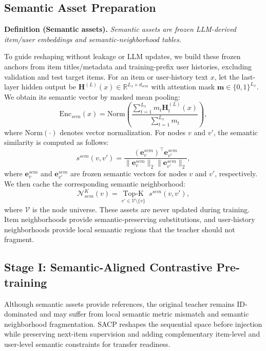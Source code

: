 ﻿\documentclass{article}
\begin{document}
\subsection{Semantic Asset Preparation}

\noindent\textbf{Definition (Semantic assets).} \textit{Semantic assets are frozen LLM-derived item/user embeddings and semantic-neighborhood tables.}

To guide reshaping without leakage or LLM updates, we build these frozen anchors from item titles/metadata and training-prefix user histories, excluding validation and test target items. For an item or user-history text $x$, let the last-layer hidden output be $\mathbf{H}^{(L)}(x)\in\mathbb{R}^{L_x\times d_{sem}}$ with attention mask $\mathbf{m}\in\{0,1\}^{L_x}$. We obtain its semantic vector by masked mean pooling:
\begin{equation}
\mathrm{Enc}_{sem}(x)=
\mathrm{Norm}\!\left(
\frac{\sum_{t=1}^{L_x} m_t \mathbf{H}^{(L)}_t(x)}
{\sum_{t=1}^{L_x} m_t}
\right),
\end{equation}
where $\mathrm{Norm}(\cdot)$ denotes vector normalization. For nodes $v$ and $v'$, the semantic similarity is computed as follows:
\begin{equation}
s^{sem}(v,v')
=
\frac{(\mathbf{e}_v^{sem})^\top \mathbf{e}_{v'}^{sem}}
{\|\mathbf{e}_v^{sem}\|_2\|\mathbf{e}_{v'}^{sem}\|_2},
\end{equation}
where $\mathbf{e}_v^{sem}$ and $\mathbf{e}_{v'}^{sem}$ are frozen semantic vectors for nodes $v$ and $v'$, respectively. We then cache the corresponding semantic neighborhood:
\begin{equation}
\mathcal{N}_{sem}^{K}(v)
=
\operatorname*{Top\text{-}K}_{v'\in\mathcal{V}\setminus\{v\}}
\ s^{sem}(v,v'),
\end{equation}
where $\mathcal{V}$ is the node universe. These assets are never updated during training. Item neighborhoods provide semantic-preserving substitutions, and user-history neighborhoods provide local semantic regions that the teacher should not fragment.

\subsection{Stage I: Semantic-Aligned Contrastive Pre-training}

Although semantic assets provide references, the original teacher remains ID-dominated and may suffer from local semantic metric mismatch and semantic neighborhood fragmentation. SACP reshapes the sequential space before injection while preserving next-item supervision and adding complementary item-level and user-level semantic constraints for transfer readiness.
\end{document}
